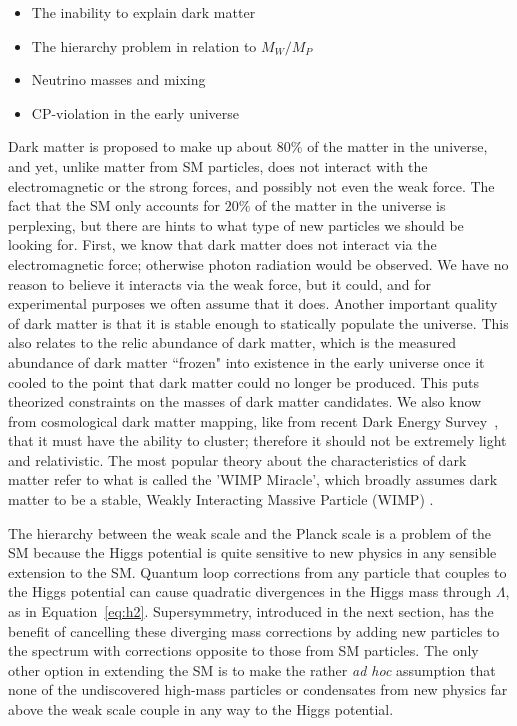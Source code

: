 \begin{itemize}
\item The inability to explain dark matter \cite{BERTONE2005279}
\item The hierarchy problem in relation to $M_W/M_P$
\item Neutrino masses and mixing \cite{1367-2630-16-4-045018, Fukuda:1998mi, Ahmad:2001an}
\item CP-violation in the early universe \cite{Sakharov:1967dj}
 \end{itemize}
Dark matter is proposed to make up about $80\%$ of the matter in the universe, and yet, unlike matter from SM particles, does not interact with the electromagnetic or the strong forces, and possibly not even the weak force.  The fact that the SM only accounts for $20\%$ of the matter in the universe is perplexing, but there are hints to what type of new particles we should be looking for.  First, we know that dark matter does not interact via the electromagnetic force; otherwise photon radiation would be observed.  We have no reason to believe it interacts via the weak force, but it could, and for experimental purposes we often assume that it does.  Another important quality of dark matter is that it is stable enough to statically populate the universe.  This also relates to the relic abundance of dark matter, which is the measured abundance of dark matter ``frozen" into existence in the early universe once it cooled to the point that dark matter could no longer be produced.  This puts theorized constraints on the masses of dark matter candidates.  We also know from cosmological dark matter mapping, like from recent Dark Energy Survey~\cite{surveydm}, that it must have the ability to cluster; therefore it should not be extremely light and relativistic.  The most popular theory about the characteristics of dark matter refer to what is called the 'WIMP Miracle', which broadly assumes dark matter to be a stable, Weakly Interacting Massive Particle (WIMP) \cite{Kilic:2010fs, McDonald:2012vw}.  %

The hierarchy between the weak scale and the Planck scale is a problem of the SM because the Higgs potential is quite sensitive to new physics in any sensible extension to the SM.  Quantum loop corrections from any particle that couples to the Higgs potential can cause quadratic divergences in the Higgs mass through $\Lambda$, as in Equation~\ref{eq:h2}.  Supersymmetry, introduced in the next section, has the benefit of cancelling these diverging mass corrections by adding new particles to the spectrum with corrections opposite to those from SM particles.  The only other option in extending the SM is to make the rather \textit{ad hoc} assumption that none of the undiscovered high-mass particles or condensates from new physics far above the weak scale couple in any way to the Higgs potential.  


